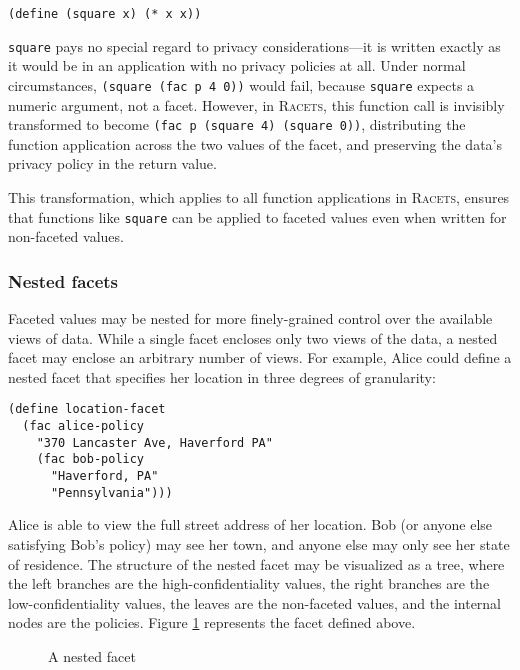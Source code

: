 \documentclass{article}
\begin{document}
\begin{lstlisting}
(define (square x) (* x x))
\end{lstlisting}

\texttt{square} pays no special regard to privacy considerations---it is written exactly as it would be in an application with no privacy policies at all. Under normal circumstances, \texttt{(square (fac p 4 0))} would fail, because \texttt{square} expects a numeric argument, not a facet. However, in \textsc{Racets}, this function call is invisibly transformed to become \texttt{(fac p (square 4) (square 0))}, distributing the function application across the two values of the facet, and preserving the data's privacy policy in the return value.

This transformation, which applies to all function applications in \textsc{Racets}, ensures that functions like \texttt{square} can be applied to faceted values even when written for non-faceted values.


\subsubsection{Nested facets}
Faceted values may be nested for more finely-grained control over the available views of data. While a single facet encloses only two views of the data, a nested facet may enclose an arbitrary number of views. For example, Alice could define a nested facet that specifies her location in three degrees of granularity:

\begin{lstlisting}
(define location-facet
  (fac alice-policy
    "370 Lancaster Ave, Haverford PA"
    (fac bob-policy
      "Haverford, PA"
      "Pennsylvania")))
\end{lstlisting}

Alice is able to view the full street address of her location. Bob (or anyone else satisfying Bob's policy) may see her town, and anyone else may only see her state of residence. The structure of the nested facet may be visualized as a tree, where the left branches are the high-confidentiality values, the right branches are the low-confidentiality values, the leaves are the non-faceted values, and the internal nodes are the policies. Figure \ref{figure:nested} represents the facet defined above.

\begin{figure}[h]
\begin{center}
	\caption{A nested facet}
	\label{figure:nested}
\end{center}
\end{figure}
\end{document}
